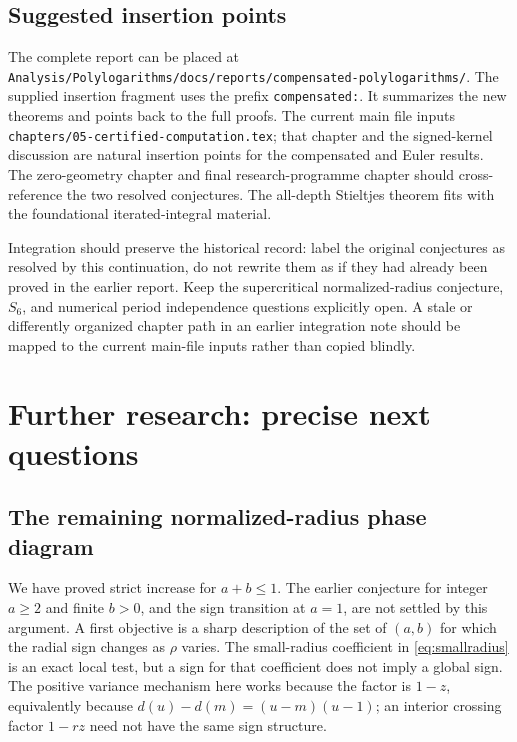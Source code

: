 \documentclass[11pt]{article}
\numberwithin{equation}{section}
\theoremstyle{definition}
\theoremstyle{remark}
\begin{document}
\subsection{Suggested insertion points}
The complete report can be placed at
\nolinkurl{Analysis/Polylogarithms/docs/reports/compensated-polylogarithms/}.
The supplied insertion fragment uses the prefix \texttt{compensated:}.
It summarizes the new theorems and points back to the full proofs.
The current main file inputs \texttt{chapters/05-certified-computation.tex};
that chapter and the signed-kernel discussion are natural insertion
points for the compensated and Euler results. The zero-geometry chapter
and final research-programme chapter should cross-reference the two
resolved conjectures. The all-depth Stieltjes theorem fits with the
foundational iterated-integral material.

Integration should preserve the historical record: label the original
conjectures as resolved by this continuation, do not rewrite them as
if they had already been proved in the earlier report. Keep the
supercritical normalized-radius conjecture, $S_6$, and numerical period
independence questions explicitly open. A stale or differently organized
chapter path in an earlier integration note should be mapped to the
current main-file inputs rather than copied blindly.

\section{Further research: precise next questions}
\label{sec:future}
\subsection{The remaining normalized-radius phase diagram}
We have proved strict increase for $a+b\le1$. The earlier conjecture
for integer $a\ge2$ and finite $b>0$, and the sign transition at $a=1$,
are not settled by this argument. A first objective is a sharp description
of the set of $(a,b)$ for which the radial sign changes as $\rho$ varies.
The small-radius coefficient in \eqref{eq:smallradius} is an exact local
test, but a sign for that coefficient does not imply a global sign.
The positive variance mechanism here works because the factor is
$1-z$, equivalently because $d(u)-d(m)=(u-m)(u-1)$; an interior
crossing factor $1-rz$ need not have the same sign structure.
\end{document}
